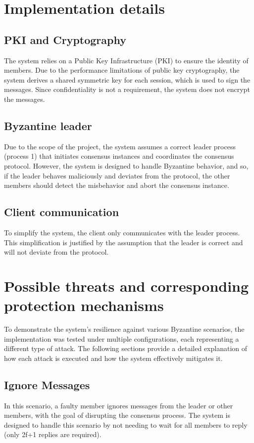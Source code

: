 \documentclass[runningheads]{llncs}
\begin{document}
%
\section{Implementation details}
\subsection{PKI and Cryptography}
The system relies on a Public Key Infrastructure (PKI) to ensure the identity of
members. Due to the performance limitations of public key cryptography, the
system derives a shared symmetric key for each session, which is used to sign
the messages. Since confidentiality is not a requirement, the system does not
encrypt the messages.
%
\subsection{Byzantine leader}
Due to the scope of the project, the system assumes a correct leader process
(process 1) that initiates consensus instances and coordinates the consensus
protocol. However, the system is designed to handle Byzantine behavior, and so,
if the leader behaves maliciously and deviates from the protocol, the other
members should detect the misbehavior and abort the consensus instance.
%
\subsection{Client communication}
To simplify the system, the client only communicates with the leader process. This
simplification is justified by the assumption that the leader is correct and
will not deviate from the protocol.
%
\section{Possible threats and corresponding protection mechanisms}
To demonstrate the system's resilience against various Byzantine scenarios, the
implementation was tested under multiple configurations, each representing a
different type of attack. The following sections provide a detailed explanation
of how each attack is executed and how the system effectively mitigates it.
%
\subsection{Ignore Messages}
In this scenario, a faulty member ignores messages from the leader or other
members, with the goal of disrupting the consensus process. The system is
designed to handle this scenario by not needing to wait for all members to reply
(only 2f+1 replies are required).
%
\end{document}

